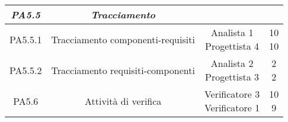 \documentclass{scalatekids-article}
\begin{document}
\begin{center}
\begin{tabular}{| c | c | c | c |}
    \hline
    \textit{PA5.5} & \textit{Tracciamento} &  &\\
    \hline
    PA5.5.1 & Tracciamento componenti-requisiti & \multiLineCell[t]{Analista 1\\Progettista 4} & \multiLineCell[t]{10\\10}\\
    \hline
    PA5.5.2 & Tracciamento requisiti-componenti & \multiLineCell[t]{Analista 2\\Progettista 3} & \multiLineCell[t]{2\\2}\\
    \hline
    PA5.6 & Attività di verifica & \multiLineCell[t]{Verificatore 3\\Verificatore 1} & \multiLineCell[t]{10\\9}\\
    \hline
  \end{tabular}
\end{center}
\normalsize
\end{document}
